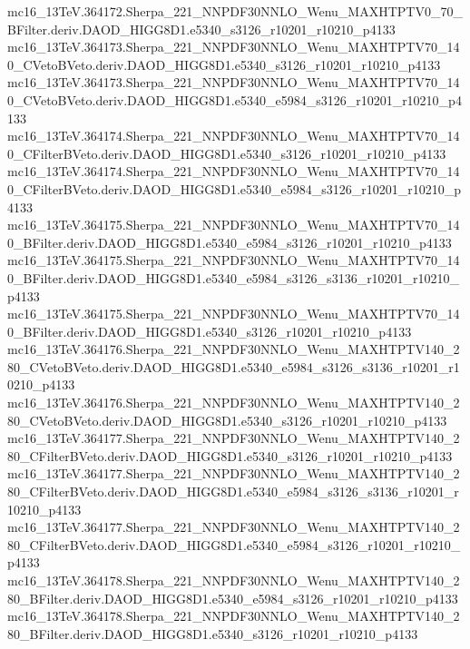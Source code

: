 \begin{scriptsize}
mc16\_13TeV.364172.Sherpa\_221\_NNPDF30NNLO\_Wenu\_MAXHTPTV0\_70\_BFilter.deriv.DAOD\_HIGG8D1.e5340\_s3126\_r10201\_r10210\_p4133 \\
mc16\_13TeV.364173.Sherpa\_221\_NNPDF30NNLO\_Wenu\_MAXHTPTV70\_140\_CVetoBVeto.deriv.DAOD\_HIGG8D1.e5340\_s3126\_r10201\_r10210\_p4133 \\
mc16\_13TeV.364173.Sherpa\_221\_NNPDF30NNLO\_Wenu\_MAXHTPTV70\_140\_CVetoBVeto.deriv.DAOD\_HIGG8D1.e5340\_e5984\_s3126\_r10201\_r10210\_p4133 \\
mc16\_13TeV.364174.Sherpa\_221\_NNPDF30NNLO\_Wenu\_MAXHTPTV70\_140\_CFilterBVeto.deriv.DAOD\_HIGG8D1.e5340\_s3126\_r10201\_r10210\_p4133 \\
mc16\_13TeV.364174.Sherpa\_221\_NNPDF30NNLO\_Wenu\_MAXHTPTV70\_140\_CFilterBVeto.deriv.DAOD\_HIGG8D1.e5340\_e5984\_s3126\_r10201\_r10210\_p4133 \\
mc16\_13TeV.364175.Sherpa\_221\_NNPDF30NNLO\_Wenu\_MAXHTPTV70\_140\_BFilter.deriv.DAOD\_HIGG8D1.e5340\_e5984\_s3126\_r10201\_r10210\_p4133 \\
mc16\_13TeV.364175.Sherpa\_221\_NNPDF30NNLO\_Wenu\_MAXHTPTV70\_140\_BFilter.deriv.DAOD\_HIGG8D1.e5340\_e5984\_s3126\_s3136\_r10201\_r10210\_p4133 \\
mc16\_13TeV.364175.Sherpa\_221\_NNPDF30NNLO\_Wenu\_MAXHTPTV70\_140\_BFilter.deriv.DAOD\_HIGG8D1.e5340\_s3126\_r10201\_r10210\_p4133 \\
mc16\_13TeV.364176.Sherpa\_221\_NNPDF30NNLO\_Wenu\_MAXHTPTV140\_280\_CVetoBVeto.deriv.DAOD\_HIGG8D1.e5340\_e5984\_s3126\_s3136\_r10201\_r10210\_p4133 \\
mc16\_13TeV.364176.Sherpa\_221\_NNPDF30NNLO\_Wenu\_MAXHTPTV140\_280\_CVetoBVeto.deriv.DAOD\_HIGG8D1.e5340\_s3126\_r10201\_r10210\_p4133 \\
mc16\_13TeV.364177.Sherpa\_221\_NNPDF30NNLO\_Wenu\_MAXHTPTV140\_280\_CFilterBVeto.deriv.DAOD\_HIGG8D1.e5340\_s3126\_r10201\_r10210\_p4133 \\
mc16\_13TeV.364177.Sherpa\_221\_NNPDF30NNLO\_Wenu\_MAXHTPTV140\_280\_CFilterBVeto.deriv.DAOD\_HIGG8D1.e5340\_e5984\_s3126\_s3136\_r10201\_r10210\_p4133 \\
mc16\_13TeV.364177.Sherpa\_221\_NNPDF30NNLO\_Wenu\_MAXHTPTV140\_280\_CFilterBVeto.deriv.DAOD\_HIGG8D1.e5340\_e5984\_s3126\_r10201\_r10210\_p4133 \\
mc16\_13TeV.364178.Sherpa\_221\_NNPDF30NNLO\_Wenu\_MAXHTPTV140\_280\_BFilter.deriv.DAOD\_HIGG8D1.e5340\_e5984\_s3126\_r10201\_r10210\_p4133 \\
mc16\_13TeV.364178.Sherpa\_221\_NNPDF30NNLO\_Wenu\_MAXHTPTV140\_280\_BFilter.deriv.DAOD\_HIGG8D1.e5340\_s3126\_r10201\_r10210\_p4133 \\

\end{scriptsize}
